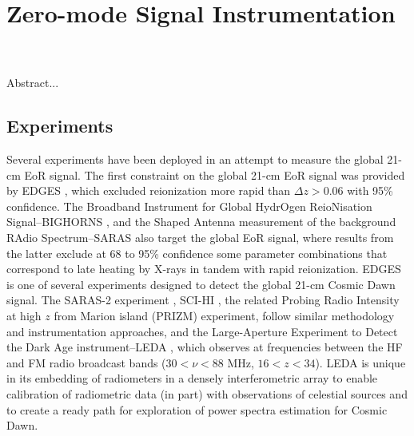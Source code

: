 
%
%

\chapter{Zero-mode Signal Instrumentation}

\begin{bf}
\author{L. J. Greenhill (Harvard-Smithsonian Center for Astrophysics),\\  R. Subrahmanyan (Raman Research Institute)}  
  
\\
\\

Abstract...\\

\end{bf}

\section{Experiments}


Several experiments have been deployed in an attempt to measure the global 21-cm EoR signal. The first constraint on the global 21-cm EoR signal was provided by EDGES \cite{bowman08,rogers12}, which excluded reionization more rapid than $\Delta z > 0.06$ with 95\% confidence. The Broadband Instrument for Global HydrOgen ReioNisation Signal--BIGHORNS \cite{sokolowski15}, and the Shaped Antenna measurement of the background RAdio Spectrum--SARAS \cite{patra13, singh17,singh18} also target the global EoR signal, where results from the latter exclude at 68 to 95\% confidence some parameter combinations that correspond to late heating by X-rays in tandem with rapid reionization.  EDGES is one of several experiments designed to detect the global 21-cm Cosmic Dawn signal. The SARAS-2 experiment \cite{singh17}, SCI-HI \cite{voytek14},  the related Probing Radio Intensity at high $z$ from Marion island (PRIZM) experiment, follow similar methodology and instrumentation approaches, and the Large-Aperture Experiment to Detect the Dark Age instrument--LEDA \cite{price18}, which observes at frequencies between the HF and FM radio broadcast bands (30$<\nu<$88 MHz, $16<z<34$). LEDA is unique in its embedding of radiometers in a densely interferometric array to enable calibration of radiometric data (in part) with observations of celestial sources and to create a ready path for exploration of power spectra estimation for Cosmic Dawn. 


